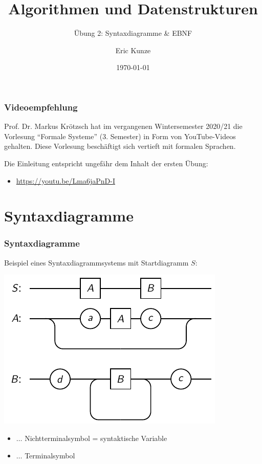 \documentclass{beamer}
\begin{document}
	
	\title{Algorithmen und Datenstrukturen}
	\subtitle{Übung 2: Syntaxdiagramme \& EBNF}
	\author{Eric Kunze}
	\date{\today}

	\maketitle



\begin{frame} \frametitle{Videoempfehlung}
	
	
	Prof. Dr. Markus Krötzsch hat im vergangenen Wintersemester 2020/21 die Vorlesung \enquote{Formale Systeme} (3. Semester) in Form von YouTube-Videos gehalten. Diese Vorlesung beschäftigt sich vertieft mit formalen Sprachen.
	
	Die Einleitung entspricht ungefähr dem Inhalt der ersten Übung:
	\begin{itemize}
		\item  \url{https://youtu.be/Lma6jaPnD-I}
	\end{itemize}
\end{frame}

\section{Syntaxdiagramme}

\begin{frame} \frametitle{Syntaxdiagramme}
	\small
	Beispiel eines Syntaxdiagrammsystems mit Startdiagramm $S$:
	\begin{center}
		\includegraphics[width=.5\textwidth]{tut02_syntax-dia-bsp.pdf}
	\end{center}
	\begin{itemize}
		\item[]  $\dots$
		Nichtterminalsymbol = syntaktische Variable
		\item[]  $\dots$
		Terminalsymbol
	\end{itemize}
\end{frame}
\end{document}
